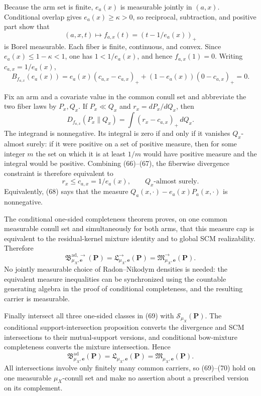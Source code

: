 Because the arm set is finite, \(e_a(x)\) is measurable jointly in \((a,x)\).  Conditional overlap gives \(e_a(x)\ge\kappa>0\), so reciprocal, subtraction, and positive part show that
\[
 (a,x,t)\longmapsto f_{a,x}(t)=(t-1/e_a(x))_+
\]
is Borel measurable.  Each fiber is finite, continuous, and convex.  Since \(e_a(x)\le1-\kappa<1\), one has \(1<1/e_a(x)\), and hence \(f_{a,x}(1)=0\).  Writing \(c_{a,x}=1/e_a(x)\),
\[
 B_{f_{a,x}}(e_a(x))
 =e_a(x)(c_{a,x}-c_{a,x})_+
  +(1-e_a(x))(0-c_{a,x})_+=0. \tag{66}
\]

Fix an arm and a covariate value in the common conull set and abbreviate the two fiber laws by \(P_x,Q_x\).  If \(P_x\ll Q_x\) and \(r_x=dP_x/dQ_x\), then
\[
 D_{f_{a,x}}(P_x\|Q_x)
 =\int(r_x-c_{a,x})_+\,dQ_x. \tag{67}
\]
The integrand is nonnegative.  Its integral is zero if and only if it vanishes \(Q_x\)-almost surely: if it were positive on a set of positive measure, then for some integer \(m\) the set on which it is at least \(1/m\) would have positive measure and the integral would be positive.  Combining (66)--(67), the fiberwise divergence constraint is therefore equivalent to
\[
 r_x\le c_{a,x}=1/e_a(x),\qquad Q_x\text{-almost surely}. \tag{68}
\]
Equivalently, (68) says that the measure \(Q_a(x,\cdot)-e_a(x)P_a(x,\cdot)\) is nonnegative.

The conditional one-sided completeness theorem proves, on one common measurable conull set and simultaneously for both arms, that this measure cap is equivalent to the residual-kernel mixture identity and to global SCM realizability.  Therefore
\[
 \mathfrak B^{\mathrm{ad},\to}_{\mu_X,\boldsymbol e}(\boldsymbol P)
 =\mathfrak L^{\to}_{\mu_X,\boldsymbol e}(\boldsymbol P)
 =\mathfrak M^{\to}_{\mu_X,\boldsymbol e}(\boldsymbol P). \tag{69}
\]
No jointly measurable choice of Radon--Nikodym densities is needed: the equivalent measure inequalities can be synchronized using the countable generating algebra in the proof of conditional completeness, and the resulting carrier is measurable.

Finally intersect all three one-sided classes in (69) with \(\mathcal S_{\mu_X}(\boldsymbol P)\).  The conditional support-intersection proposition converts the divergence and SCM intersections to their mutual-support versions, and conditional bow-mixture completeness converts the mixture intersection.  Hence
\[
 \mathfrak B^{\mathrm{ad}}_{\mu_X,\boldsymbol e}(\boldsymbol P)
 =\mathfrak L_{\mu_X,\boldsymbol e}(\boldsymbol P)
 =\mathfrak M_{\mu_X,\boldsymbol e}(\boldsymbol P). \tag{70}
\]
All intersections involve only finitely many common carriers, so (69)--(70) hold on one measurable \(\mu_X\)-conull set and make no assertion about a prescribed version on its complement.